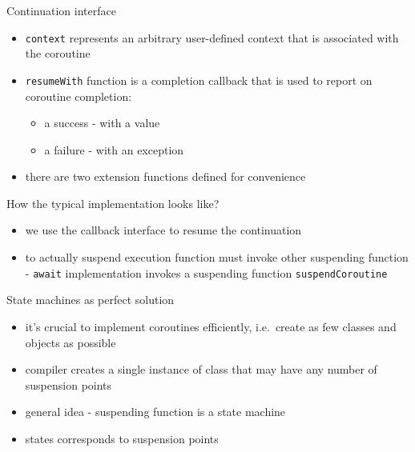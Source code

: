 \documentclass[hyperref={pdfpagelabels=false},xcolor={dvipsnames},compress,onlytextwidth]{beamer}
\begin{document}
    \begin{frame}[fragile]{Continuation interface}
        \begin{itemize}
            \item<1-> \texttt{context} represents an arbitrary user-defined context that is associated with the coroutine
            \item<2-> \texttt{resumeWith} function is a completion callback that is used to report on coroutine completion:
            \begin{itemize}
                \item<3-> a success - with a value
                \item<4-> a failure - with an exception
            \end{itemize}
            \item<5-> there are two extension functions defined for convenience
        \end{itemize}
    \end{frame}

    \begin{frame}[fragile]{How the typical implementation looks like?}
        \only<1>{}
        \begin{itemize}
            \item<3-> we use the callback interface to resume the continuation\pause
            \item<4-> to actually suspend execution function must invoke other suspending function - \texttt{await} implementation invokes a suspending function \texttt{suspendCoroutine}
        \end{itemize}
    \end{frame}

    \begin{frame}[fragile]{State machines as perfect solution}
        \begin{itemize}
            \item it's crucial to implement coroutines efficiently, i.e.\ create as few classes and objects as possible\pause
            \item compiler creates a single instance of class that may have any number of suspension points\pause
            \item general idea - suspending function is a state machine\pause
            \item states corresponds to suspension points\pause
        \end{itemize}
        
    \end{frame}
\end{document}
